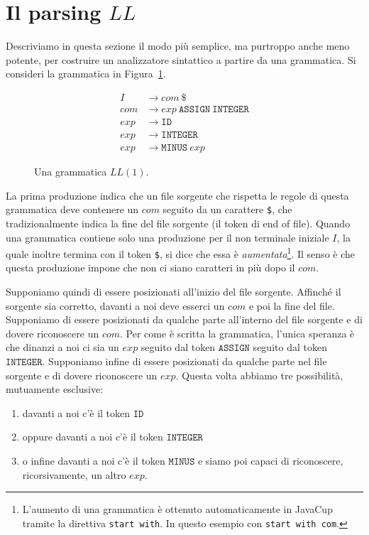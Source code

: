 \section{Il parsing $\mathit{LL}$}\label{sec:ll}
%
Descriviamo in questa sezione il modo pi\`u semplice, ma purtroppo anche
meno potente, per costruire un analizzatore sintattico a partire
da una grammatica. Si consideri la grammatica in Figura~\ref{fig:ll1_grammar}.
%
\begin{figure}[t]
\begin{align*}
  \mathit{I}&\to\mathit{com}\ \mathtt{\$}\\
  \mathit{com}&\to\mathit{exp}\ \mathtt{ASSIGN}\ \mathtt{INTEGER}\\
  \mathit{exp}&\to\mathtt{ID}\\
  \mathit{exp}&\to\mathtt{INTEGER}\\
  \mathit{exp}&\to\mathtt{MINUS}\ \mathit{exp}
\end{align*}
\caption{Una grammatica $\mathit{LL}(1)$.}\label{fig:ll1_grammar}
\end{figure}
%
La prima produzione indica che un file sorgente che rispetta le regole
di questa grammatica deve contenere un $\mathit{com}$ seguito da
un carattere \texttt{\$}, che tradizionalmente
indica la fine del file sorgente (il token di end of file).
Quando una grammatica contiene solo una produzione per il non terminale
iniziale $I$, la quale inoltre termina con il token \texttt{\$},
si dice che essa \`e
\emph{aumentata}\footnote{L'aumento di una grammatica \`e ottenuto
automaticamente in JavaCup tramite la direttiva \texttt{start with}. In questo esempio
con \texttt{start with com}.}.
Il senso \`e che questa produzione impone che non ci siano
caratteri in pi\`u dopo il $\mathit{com}$.

Supponiamo quindi di essere posizionati all'inizio del file sorgente.
Affinch\'e il sorgente sia corretto, davanti a noi deve esserci un
$\mathit{com}$ e poi la fine del file. Supponiamo di essere
posizionati da qualche parte all'interno del file sorgente e di dovere
riconoscere un $\mathit{com}$. Per come \`e scritta la grammatica,
l'unica speranza \`e che dinanzi a noi ci sia un $\mathit{exp}$ seguito dal
token $\mathtt{ASSIGN}$ seguito dal token $\mathtt{INTEGER}$.
Supponiamo infine di essere posizionati da qualche parte nel file sorgente
e di dovere riconoscere un $\mathit{exp}$. Questa volta abbiamo tre
possibilit\`a, mutuamente esclusive:
%
\begin{enumerate}
\item davanti a noi c'\`e il token $\mathtt{ID}$
\item oppure davanti a noi c'\`e il token $\mathtt{INTEGER}$
\item o infine davanti a noi c'\`e il token $\mathtt{MINUS}$ e siamo
      poi capaci di riconoscere, ricorsivamente, un altro $\mathit{exp}$.
\end{enumerate}

